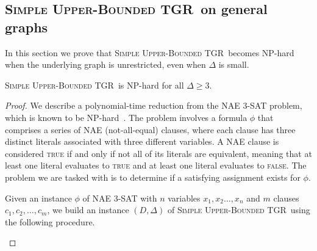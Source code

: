 \documentclass[a4paper,UKenglish,cleveref, autoref, thm-restate]{lipics-v2021}
\newcommand{\deltaUpperBound}{\textsc{Simple Upper-Bounded TGR}}
\begin{document}
\subsection{\deltaUpperBound\ on general graphs}
In this section we prove that \deltaUpperBound\ becomes NP-hard when the underlying graph is unrestricted, even when $\Delta$ is small.

\begin{theorem}\label{thm:NP-upperBound}
	\deltaUpperBound\ is NP-hard for all $\Delta \geq 3$.
\end{theorem}

\begin{proof}
    We describe a polynomial-time reduction from the  NAE 3-SAT problem, which is known to be NP-hard~\cite{Schaefer1978complexity}. The problem involves a formula $\phi$ that comprises a series of NAE (not-all-equal) clauses, where each clause has three distinct literals associated with three different variables. 
    A NAE clause is considered \textsc{true} if and only if not all of its literals are equivalent, meaning that at least one literal evaluates to \textsc{true} and at least one literal evaluates to \textsc{false}. The problem we are tasked with is to determine if a satisfying assignment exists for $\phi$.

    Given an instance $\phi$ of NAE 3-SAT with $n$ variables $x_1,x_2 \dots , x_n$ and $m$ clauses $c_1, c_2, \dots, c_m$, we build an instance $(D,\Delta)$ of \deltaUpperBound\ using the following procedure.

\begin{figure}[hbt]
	\noindent
\end{figure}
\end{proof}
\end{document}
